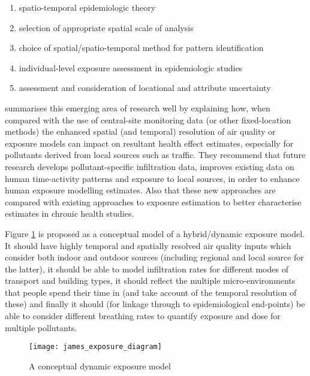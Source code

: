 \begin{enumerate}
  \item spatio-temporal epidemiologic theory
  \item selection of appropriate spatial scale of analysis
  \item choice of spatial/spatio-temporal method for pattern identification
  \item individual-level exposure assessment in epidemiologic studies
  \item assessment and consideration of locational and attribute uncertainty
\end{enumerate}

\cite{Baxter2013} summarises this emerging area of research well by explaining how, when compared with the use of central-site monitoring data (or other fixed-location methods) the enhanced spatial (and temporal) resolution of air quality or exposure models can impact on resultant health effect estimates, especially for pollutants derived from local sources such as traffic.  They recommend that future research develops pollutant-specific infiltration data, improves existing data on human time-activity patterns and exposure to local sources, in order to enhance human exposure modelling estimates. Also that these new approaches are compared with existing approaches to exposure estimation to better characterise estimates in chronic health studies.

\vspace{1cm}
Figure \ref{fig:james_exposure_diagram} is proposed as a conceptual model of a hybrid/dynamic exposure model. It should have highly temporal and spatially resolved air quality inputs which consider both indoor and outdoor sources (including regional and local source for the latter), it should be able to model infiltration rates for different modes of transport and building types, it should reflect the multiple micro-environments that people spend their time in (and take account of the temporal resolution of these) and finally it should (for linkage through to epidemiological end-points) be able to consider different breathing rates to quantify exposure and dose for multiple pollutants.

\begin{figure}[H]
\centering
\texttt{[image: james\_exposure\_diagram]}
\caption{A conceptual dynamic exposure model}
\label{fig:james_exposure_diagram}
\end{figure}

